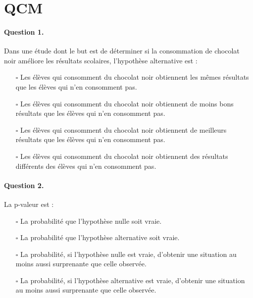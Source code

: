 \section{QCM}

\paragraph{Question 1.} Dans une étude dont le but est de déterminer si la
consommation de chocolat noir améliore les résultats scolaires, l'hypothèse
alternative est :
\begin{itemize}
\item[$\square$] Les élèves qui consomment du chocolat noir obtiennent les
  mêmes résultats que les élèves qui n'en consomment pas.
\item[$\square$] Les élèves qui consomment du chocolat noir obtiennent de moins
  bons résultats que les élèves qui n'en consomment pas.
\item[$\square$] Les élèves qui consomment du chocolat noir obtiennent de
  meilleurs résultats que les élèves qui n'en consomment pas.
\item[$\square$] Les élèves qui consomment du chocolat noir obtiennent des
  résultats différents des élèves qui n'en consomment pas.
\end{itemize}

\paragraph{Question 2.} La p-valeur est :
\begin{itemize}
\item[$\square$] La probabilité que l'hypothèse nulle soit vraie.
\item[$\square$] La probabilité que l'hypothèse alternative soit vraie.
\item[$\square$] La probabilité, si l'hypothèse nulle est vraie, d'obtenir une
  situation au moins aussi surprenante que celle observée.
\item[$\square$] La probabilité, si l'hypothèse alternative est vraie,
  d'obtenir une situation au moins aussi surprenante que celle observée.
\end{itemize}

